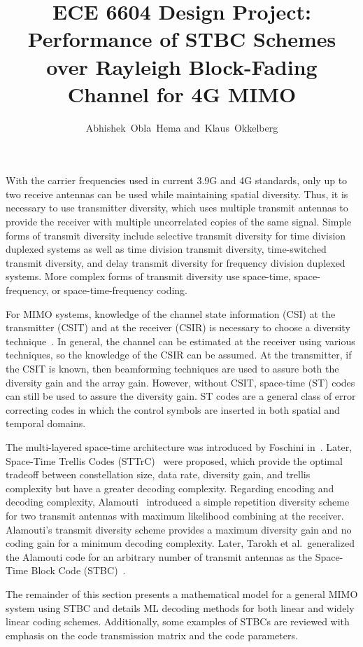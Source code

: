 \message{ !name(report.tex)}\documentclass[12pt,onecolumn]{IEEEtran}
\title{ECE 6604 Design Project:\\ Performance of STBC Schemes over Rayleigh Block-Fading Channel for 4G MIMO}
\author{Abhishek~Obla~Hema and~Klaus~Okkelberg}
\begin{document}

With the carrier frequencies used in current 3.9G and 4G standards, only up to two receive antennas can be used while maintaining spatial diversity. Thus, it is necessary to use transmitter diversity, which uses multiple transmit antennas to provide the receiver with multiple uncorrelated copies of the same signal. Simple forms of transmit diversity include selective transmit diversity for time division duplexed systems as well as time division transmit diversity, time-switched transmit diversity, and delay transmit diversity for frequency division duplexed systems. More complex forms of transmit diversity use space-time, space-frequency, or space-time-frequency coding.

For MIMO systems, knowledge of the channel state information (CSI) at the transmitter (CSIT) and at the receiver (CSIR) is necessary to choose a diversity technique~\cite{caire03,weingarten06}. In general, the channel can be estimated at the receiver using various techniques, so the knowledge of the CSIR can be assumed. At the transmitter, if the CSIT is known, then beamforming techniques are used to assure both the diversity gain and the array gain. However, without CSIT, space-time (ST) codes can still be used to assure the diversity gain. ST codes are a general class of error correcting codes in which the control symbols are inserted in both spatial and temporal domains.

The multi-layered space-time architecture was introduced by Foschini in~\cite{foschini96}. Later, Space-Time Trellis Codes (STTrC)~\cite{tarokh98} were proposed, which provide the optimal tradeoff between constellation size, data rate, diversity gain, and trellis complexity but have a greater decoding complexity. Regarding encoding and decoding complexity, Alamouti~\cite{alamouti98} introduced a simple repetition diversity scheme for two transmit antennas with maximum likelihood combining at the receiver. Alamouti's transmit diversity scheme provides a maximum diversity gain and no coding gain for a minimum decoding complexity. Later, Tarokh et al.\ generalized the Alamouti code for an arbitrary number of transmit antennas as the Space-Time Block Code (STBC)~\cite{tarokh99}.

The remainder of this section presents a mathematical model for a general MIMO system using STBC and details ML decoding methods for both linear and widely linear coding schemes. Additionally, some examples of STBCs are reviewed with emphasis on the code transmission matrix and the code parameters.
\end{document}
